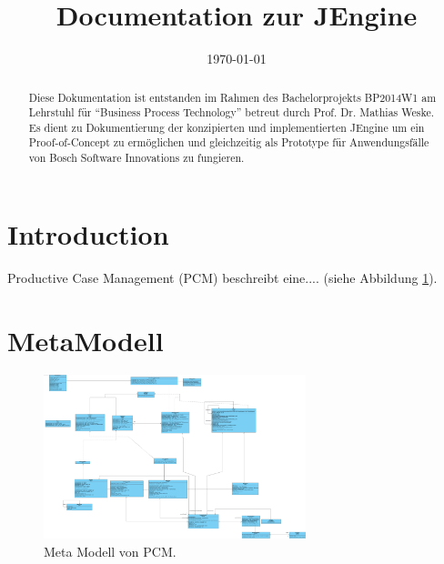 \documentclass{template/ecsreport}      %
\begin{document}
\frontmatter
\title{Documentation zur JEngine}
\addresses  {\groupname\\\deptname\\\univname}
\date       {\today}
\subject    {}
\keywords   {}
\maketitle




%
%
\begin{abstract}
Diese Dokumentation ist entstanden im Rahmen des Bachelorprojekts BP2014W1 am Lehrstuhl für ``Business Process Technology'' betreut durch Prof. Dr. Mathias Weske. Es dient zu Dokumentierung der konzipierten und implementierten JEngine um ein Proof-of-Concept zu ermöglichen und gleichzeitig als Prototype für Anwendungsfälle von Bosch Software Innovations zu fungieren.
\end{abstract}

\tableofcontents
\listoffigures
\listoftables
\lstlistoflistings
{}
\mainmatter

%
%
\section{Introduction}
Productive Case Management (PCM) beschreibt eine.... \cite{ImplementationFrameworkPCM} (siehe Abbildung \ref{fig:PCMmetaModell}).

%
%
\section{MetaModell}

\begin{figure}
\centering
\includegraphics[width=3in]{img/MetaModell_classDiagramm.jpg}
\caption{Meta Modell von PCM.}
\label{fig:PCMmetaModell}
\end{figure}
\end{document}
